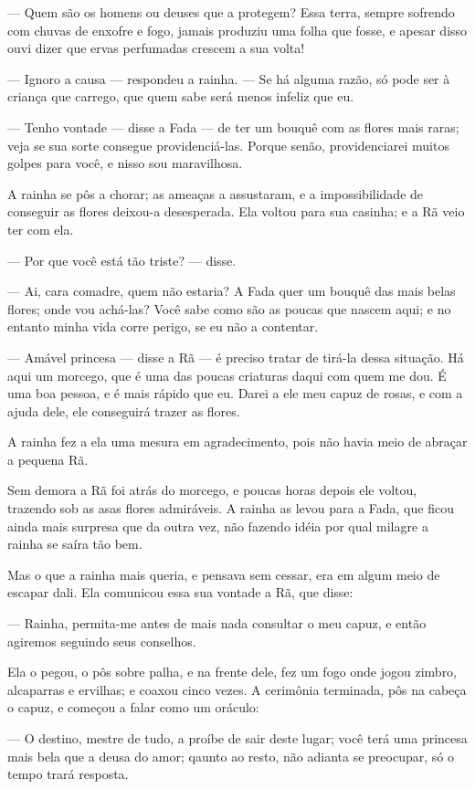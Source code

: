 — Quem são os homens ou deuses que a protegem? Essa terra, sempre
sofrendo com chuvas de enxofre e fogo, jamais produziu uma folha que
fosse, e apesar disso ouvi dizer que ervas perfumadas crescem a sua
volta!

— Ignoro a causa — respondeu a rainha. — Se há alguma razão, só pode
ser à criança que carrego, que quem sabe será menos infeliz que eu. 

— Tenho vontade — disse a Fada — de ter um bouquê com as flores mais
raras; veja se sua sorte consegue providenciá-las. Porque senão,
providenciarei muitos golpes para você, e nisso sou maravilhosa. 

A rainha se pôs a chorar; as ameaças a assustaram, e a impossibilidade
de conseguir as flores deixou-a desesperada. Ela voltou para sua
casinha; e a Rã veio ter com ela.

— Por que você está tão triste? — disse.

— Ai, cara comadre, quem não estaria? A Fada quer um bouquê das mais
belas flores; onde vou achá-las? Você sabe como são as poucas que
nascem aqui; e no entanto minha vida corre perigo, se eu não a
contentar. 

— Amável princesa — disse a Rã — é preciso tratar de tirá-la dessa
situação. Há aqui um morcego, que é uma das poucas criaturas daqui
com quem me dou. É uma boa pessoa, e é mais rápido que eu. Darei a
ele meu capuz de rosas, e com a ajuda dele, ele conseguirá trazer as
flores. 

A rainha fez a ela uma mesura em agradecimento, pois não havia meio de
abraçar a pequena Rã. 

Sem demora a Rã foi atrás do morcego, e poucas horas depois ele
voltou, trazendo sob as asas flores admiráveis. A rainha as levou
para a Fada, que ficou ainda mais surpresa que da outra vez, não
fazendo idéia por qual milagre a rainha se saíra tão bem.

Mas o que a rainha mais queria, e pensava sem cessar, era em algum
meio de escapar dali. Ela comunicou essa sua vontade a Rã, que disse:

— Rainha, permita-me antes de mais nada consultar o meu capuz, e então
agiremos seguindo seus conselhos.

Ela o pegou, o pôs sobre palha, e na frente dele, fez um fogo onde
jogou zimbro, alcaparras e ervilhas; e coaxou cinco vezes. A
cerimônia terminada, pôs na cabeça o capuz, e começou a falar como um
oráculo:

— O destino, mestre de tudo, a proíbe de sair deste lugar; você terá
uma princesa mais bela que a deusa do amor; qaunto ao resto, não
adianta se preocupar, só o tempo trará resposta.

